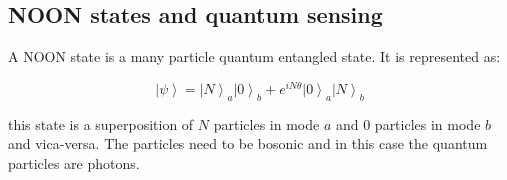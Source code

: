 \subsection{NOON states and quantum sensing}

A NOON state is a many particle quantum entangled state. It is represented as:

\begin{equation}
\left|\psi\right\rangle = \left|N\right\rangle_{a} \left|0\right\rangle_{b} + e^{iN\theta} \left|0\right\rangle_{a} \left|N\right\rangle_{b}
\end{equation}

this state is a superposition of $N$ particles in mode $a$ and 0 particles in mode $b$ and vica-versa. The particles need to be bosonic and
in this case the quantum particles are photons.
